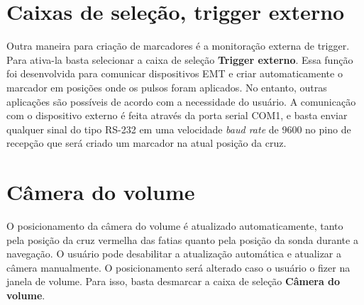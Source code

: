 \section{Caixas de seleção, trigger externo}

Outra maneira para criação de marcadores é a monitoração externa de trigger. Para ativa-la basta selecionar a caixa de seleção \textbf{Trigger externo}. Essa função foi desenvolvida para comunicar dispositivos EMT e criar automaticamente o marcador em posições onde os pulsos foram aplicados. No entanto, outras aplicações são possíveis de acordo com a necessidade do usuário.
A comunicação com o dispositivo externo é feita através da porta serial COM1, e basta enviar qualquer sinal do tipo RS-232 em uma velocidade \textit{baud rate} de 9600 no pino de recepção que será criado um marcador na atual posição da cruz.

\section{Câmera do volume}

O posicionamento da câmera do volume é atualizado automaticamente, tanto pela posição da cruz vermelha das fatias quanto pela posição da sonda durante a navegação. O usuário pode desabilitar a atualização automática e atualizar a câmera manualmente. O posicionamento será alterado caso o usuário o fizer na janela de volume.  Para isso, basta desmarcar a caixa de seleção \textbf{Câmera do volume}.

